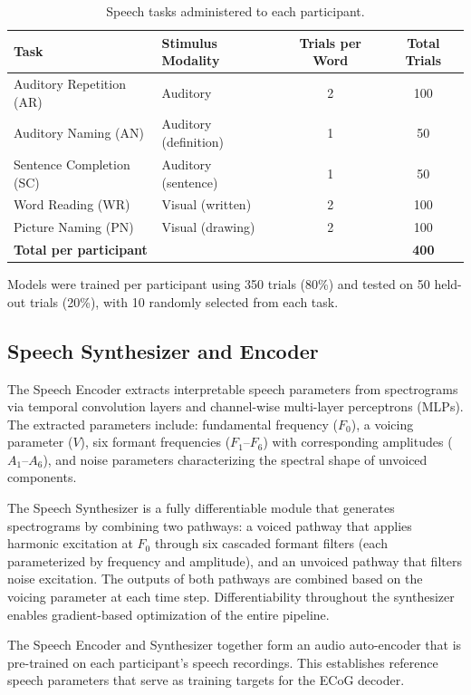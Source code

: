 \documentclass[11pt]{article}
\begin{document}
\begin{table}[htbp]
\centering
\caption{Speech tasks administered to each participant.}
\label{tab:tasks}
\begin{tabular}{llcc}
\toprule
\textbf{Task} & \textbf{Stimulus Modality} & \textbf{Trials per Word} & \textbf{Total Trials} \\
\midrule
Auditory Repetition (AR) & Auditory & 2 & 100 \\
Auditory Naming (AN) & Auditory (definition) & 1 & 50 \\
Sentence Completion (SC) & Auditory (sentence) & 1 & 50 \\
Word Reading (WR) & Visual (written) & 2 & 100 \\
Picture Naming (PN) & Visual (drawing) & 2 & 100 \\
\midrule
\textbf{Total per participant} & & & \textbf{400} \\
\bottomrule
\end{tabular}
\end{table}

Models were trained per participant using 350 trials (80\%) and tested on 50 held-out trials (20\%), with 10 randomly selected from each task.

\subsection{Speech Synthesizer and Encoder}

The Speech Encoder extracts interpretable speech parameters from spectrograms via temporal convolution layers and channel-wise multi-layer perceptrons (MLPs). The extracted parameters include: fundamental frequency ($F_0$), a voicing parameter ($V$), six formant frequencies ($F_1$--$F_6$) with corresponding amplitudes ($A_1$--$A_6$), and noise parameters characterizing the spectral shape of unvoiced components.

The Speech Synthesizer is a fully differentiable module that generates spectrograms by combining two pathways: a voiced pathway that applies harmonic excitation at $F_0$ through six cascaded formant filters (each parameterized by frequency and amplitude), and an unvoiced pathway that filters noise excitation. The outputs of both pathways are combined based on the voicing parameter at each time step. Differentiability throughout the synthesizer enables gradient-based optimization of the entire pipeline.

The Speech Encoder and Synthesizer together form an audio auto-encoder that is pre-trained on each participant's speech recordings. This establishes reference speech parameters that serve as training targets for the ECoG decoder.
\end{document}
